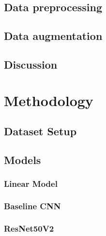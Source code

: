 \documentclass[biblatexBackend=bibtex]{tumthesis}
\begin{document}
\section{Data preprocessing}
\label{sec:dataset:data_pp}


\section{Data augmentation}
\label{sec:dataset:data_augmentation}


\section{Discussion}
\label{sec:dataset:discussion}


\chapter{Methodology}
\label{ch:methodology}


\section{Dataset Setup}
\label{sec:methodology:tfds}


\section{Models}
\label{sec:methodology:models}


\subsection{Linear Model}
\label{sec:methodology:lm}

\subsection{Baseline CNN}
\label{sec:methodology:BL_CNN}

\subsection{ResNet50V2}
\label{sec:methodology:RN50V2}
\end{document}
